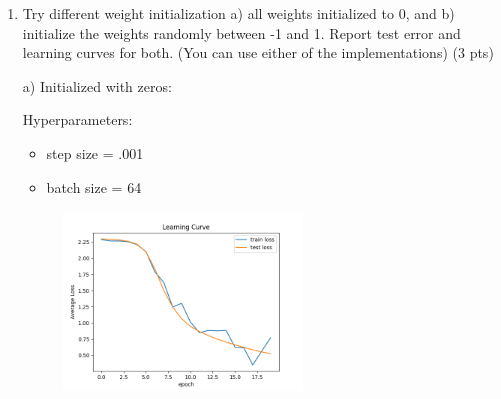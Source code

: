 \documentclass[a4paper]{article}
\theoremstyle{definition}
\newenvironment{soln}{
    \leavevmode\color{blue}\ignorespaces
}{}
\begin{document}
\begin{enumerate}
    \item Try different weight initialization a) all weights initialized to 0, and b) initialize the weights randomly between -1 and 1. Report test error and learning curves for both. (You can use either of the implementations) (3 pts)
    
    \begin{soln}

        a) Initialized with zeros:

        Hyperparameters:
        \begin{itemize}
            \item step size = .001
            \item batch size = 64
        \end{itemize}

        \begin{figure}[H]
			\centering
			\includegraphics[width=0.6\textwidth]{../figs/init_zeros_learning_curve.png}
		\end{figure}
       

\end{soln}
\end{enumerate}
\end{document}
